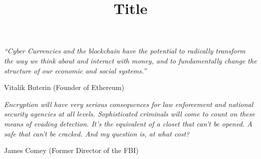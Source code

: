 \documentclass[a4paper, 11pt, oneside]{Thesis}  %
\begin{document}
\frontmatter      %

\title  {Title}

\addresses  {\groupname\\\deptname\\\univname}  %

\maketitle


\fancyhead{}  %
\rhead{\thepage}  %
\lhead{}  %

\pagestyle{fancy}  %

\pagestyle{empty}  %

\null\vfill
\textit{“Cyber Currencies and the blockchain have the potential to radically transform the way we think about and interact with money, and to fundamentally change the structure of our economic and social systems.”}

\begin{flushright}
Vitalik Buterin (Founder of Ethereum)
\end{flushright}

\null\vfill
\textit{Encryption will have very serious consequences for law enforcement and national security agencies at all levels. Sophisticated criminals will come to count on these means of evading detection. It’s the equivalent of a closet that can’t be opened. A safe that can’t be cracked. And my question is, at what cost?}

\begin{flushright}
James Comey (Former Director of the FBI)
\end{flushright}
\end{document}
